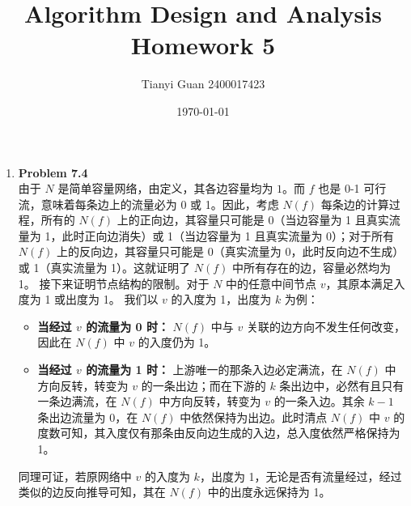 \documentclass{ctexart}
\title{\vspace*{-1cm}Algorithm Design and Analysis Homework 5}
\author{Tianyi Guan 2400017423}
\date{\today}
\begin{document}
\maketitle

\begin{enumerate}[label=\arabic*.]
    \item \textbf{Problem 7.4}\\
        由于 $N$ 是简单容量网络，由定义，其各边容量均为 $1$。而 $f$ 也是 0-1 可行流，意味着每条边上的流量必为 0 或 1。因此，考虑 $N(f)$ 每条边的计算过程，所有的 $N(f)$ 上的正向边，其容量只可能是 0（当边容量为 1 且真实流量为 1，此时正向边消失）或 1（当边容量为 1 且真实流量为 0）；对于所有 $N(f)$ 上的反向边，其容量只可能是 0（真实流量为 0，此时反向边不生成）或 1（真实流量为 1）。这就证明了 $N(f)$ 中所有存在的边，容量必然均为 1。
        接下来证明节点结构的限制。对于 $N$ 中的任意中间节点 $v$，其原本满足入度为 1 或出度为 1。
        我们以 $v$ 的入度为 1，出度为 $k$ 为例：
        \begin{itemize}
            \item \textbf{当经过 $v$ 的流量为 0 时：} $N(f)$ 中与 $v$ 关联的边方向不发生任何改变，因此在 $N(f)$ 中 $v$ 的入度仍为 1。
            \item \textbf{当经过 $v$ 的流量为 1 时：} 上游唯一的那条入边必定满流，在 $N(f)$ 中方向反转，转变为 $v$ 的一条出边；而在下游的 $k$ 条出边中，必然有且只有一条边满流，在 $N(f)$ 中方向反转，转变为 $v$ 的一条入边。其余 $k-1$ 条出边流量为 0，在 $N(f)$ 中依然保持为出边。此时清点 $N(f)$ 中 $v$ 的度数可知，其入度仅有那条由反向边生成的入边，总入度依然严格保持为 1。
        \end{itemize}
        同理可证，若原网络中 $v$ 的入度为 $k$，出度为 1，无论是否有流量经过，经过类似的边反向推导可知，其在 $N(f)$ 中的出度永远保持为 1。


\end{enumerate}
\end{document}
